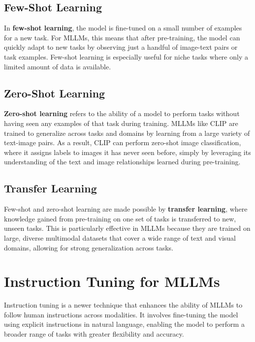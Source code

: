 \subsection{Few-Shot Learning}

In \textbf{few-shot learning}, the model is fine-tuned on a small number of examples for a new task. For MLLMs, this means that after pre-training, the model can quickly adapt to new tasks by observing just a handful of image-text pairs or task examples. Few-shot learning is especially useful for niche tasks where only a limited amount of data is available.

\subsection{Zero-Shot Learning}


\textbf{Zero-shot learning} refers to the ability of a model to perform tasks without having seen any examples of that task during training. MLLMs like CLIP are trained to generalize across tasks and domains by learning from a large variety of text-image pairs. As a result, CLIP can perform zero-shot image classification, where it assigns labels to images it has never seen before, simply by leveraging its understanding of the text and image relationships learned during pre-training.

\subsection{Transfer Learning}

Few-shot and zero-shot learning are made possible by \textbf{transfer learning}, where knowledge gained from pre-training on one set of tasks is transferred to new, unseen tasks. This is particularly effective in MLLMs because they are trained on large, diverse multimodal datasets that cover a wide range of text and visual domains, allowing for strong generalization across tasks.

\section{Instruction Tuning for MLLMs}

Instruction tuning is a newer technique that enhances the ability of MLLMs to follow human instructions across modalities. It involves fine-tuning the model using explicit instructions in natural language, enabling the model to perform a broader range of tasks with greater flexibility and accuracy.

